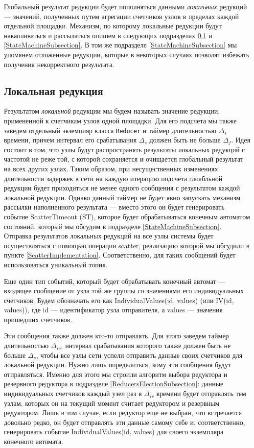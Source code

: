 Глобальный результат редукции будет пополняться данными \textit{локальных} редукций --- значений, полученных путем агрегации счетчиков узлов в пределах каждой отдельной площадки. Механизм, по которому локальные редукции будут накапливаться и рассылаться опишем в следующих подразделах \ref{LocalReductionsSubection} и \ref{StateMachineSubsection}. В том же подразделе \ref{StateMachineSubsection} мы упомянем отложенные редукции, которые в некоторых случаях позволят избежать получения некорректного результата.

\subsection{Локальная редукция}
\label{LocalReductionsSubection}

Результатом \textit{локальной} редукции мы будем называть значение редукции, примененной к счетчикам узлов одной площадки. Для его подсчета мы также заведем отдельный экземпляр класса \texttt{Reducer} и таймер длительностью $\Delta_s$ времени, причем интервал его срабатывания $\Delta_s$ должен быть не больше $\Delta_f$. Идея состоит в том, что узлы будут распространять результаты локальных редукций с частотой не реже той, с которой сохраняется и очищается глобальный результат на всех других узлах. Таким образом, при несущественных изменениях длительности задержек в сети на каждую итерацию подсчета глоабльной редукции будет приходиться не менее одного сообщения с результатом каждой локальной редукции. Однако данный таймер не будет явно запускать механизм рассылки наполненного результата --- вместо этого он будет генерировать событие ScatterTimeout (ST), которое будет обрабатываться конечным автоматом состояний, который мы обсудим в подразделе \ref{StateMachineSubsection}. Отправка результатов локальных редукций на все узлы системы будет осуществляться с помощью операции scatter, реализацию которой мы обсудили в пункте \ref{ScatterImplementation}. Соответственно, для таких сообщений будет использоваться уникальный топик.

Еще один тип событий, который будет обрабатывать конечный автомат --- входящее сообщение от узла той же группы со значениями его индивидуальных счетчиков. Будем обозначать его как IndividualValues(id, values) (или IV(id, values)), где id --- идентификатор узла отправителя, а values --- значения пришедших счетчиков.

Эти сообщения также должен кто-то отправлять. Для этого заведем таймер длительностью $\Delta_{iv}$, интервал срабатывания которого также должен быть не больше $\Delta_s$, чтобы все узлы сети успели отправить данные своих счетчиков для локальной редукции. Нужно лишь определиться, кому эти сообщения будут отправляться. Именно для этого мы строили алгоритм выбора редуктора и резервного редуктора в подразделе \ref{ReducersElectionSubsection}: данные индивидуальных счетчиков каждый узел раз в $\Delta_{iv}$ времени будет отправлять тем узлам, которых он на текущий момент считает редуктором и резервным редуктором. Лишь в том случае, если редуктор еще не выбран, что встречается довольно редко, он будет отправлять эти данные самому себе и, соответственно, генерировать событие IndividualValues(id, values) для своего экземпляра конечного автомата.


